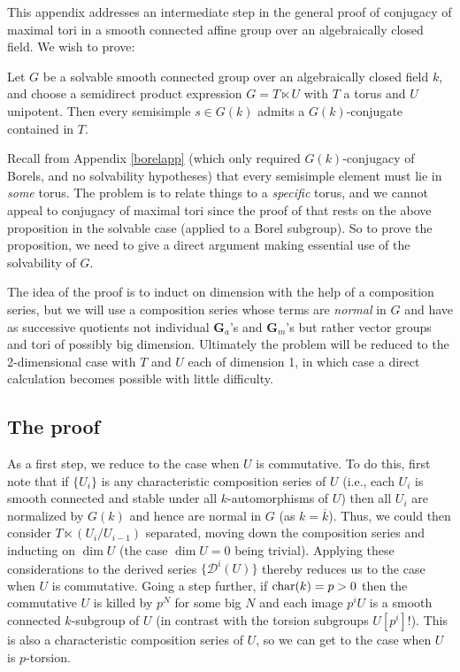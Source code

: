 \documentclass[10pt]{article}
\renewcommand{\(}{\left(}
\renewcommand{\)}{\right)}
\numberwithin{thm}{subsection}
\begin{document}
This appendix addresses an intermediate step in the general proof of conjugacy of maximal tori in a smooth connected
affine group over an algebraically closed field.  We wish to prove:

\begin{proposition} Let $G$ be a solvable smooth connected group over an algebraically closed field $k$, and choose a semidirect
product expression $G = T \ltimes U$ with $T$ a torus and $U$ unipotent.  Then every semisimple $s \in G(k)$ admits a $G(k)$-conjugate contained in $T$.
\end{proposition}

Recall from Appendix \ref{borelapp} (which only required $G(k)$-conjugacy of Borels, and no solvability hypotheses) that every semisimple
element must lie in {\em some} torus.  The problem is to relate things to a {\em specific} torus, and we cannot appeal to conjugacy of maximal tori
since the proof of that rests on the above proposition in the solvable case (applied to a Borel subgroup).   So to prove the proposition, we need to give a direct
argument making essential use of the solvability of $G$.  

The idea of the proof is to induct on dimension with the help of a composition series, but we will use a composition series whose terms are {\em normal} in $G$
and have as successive quotients not individual $\mathbf{G}_a$'s and $\mathbf{G}_m$'s but rather vector groups and tori of possibly big dimension.
Ultimately the problem will be reduced to the 2-dimensional case with $T$ and $U$ each of dimension 1, in which case a direct calculation becomes possible with little difficulty.

\subsection{The proof}

As a first step, we reduce to the case when $U$ is commutative.  To do this, first note that if $\{U_i\}$ is any characteristic composition series of
$U$ (i.e., each $U_i$ is smooth connected and stable under all $k$-automorphisms of $U$) then all $U_i$ are normalized
by $G(k)$ and hence are normal in $G$ (as $k = \overline{k}$).  Thus, we could then consider $T \ltimes (U_i/U_{i-1})$ separated, moving
down the composition series and inducting on $\dim U$ (the case $\dim U = 0$ being trivial).  Applying these considerations to
the derived series $\{\mathscr{D}^i(U)\}$ thereby reduces us to the case when $U$ is commutative.
Going a step further, if ${\rm{char}}(k) = p > 0$ then the commutative $U$ is killed by
$p^N$ for some big $N$ and each image $p^i U$ is a smooth connected $k$-subgroup of $U$
(in contrast with the torsion subgroups $U[p^i]$!).  This is also a characteristic composition series of $U$, so we
can get to the case when $U$ is $p$-torsion.
\end{document}
